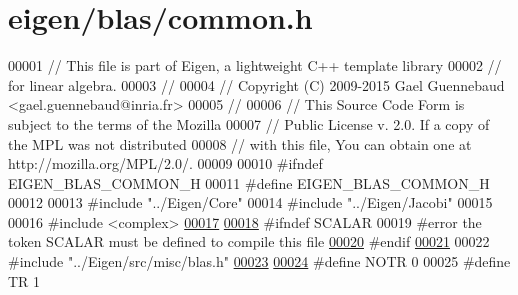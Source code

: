 \hypertarget{eigen_2blas_2common_8h_source}{}\section{eigen/blas/common.h}
\label{eigen_2blas_2common_8h_source}

\begin{DoxyCode}
00001 \textcolor{comment}{// This file is part of Eigen, a lightweight C++ template library}
00002 \textcolor{comment}{// for linear algebra.}
00003 \textcolor{comment}{//}
00004 \textcolor{comment}{// Copyright (C) 2009-2015 Gael Guennebaud <gael.guennebaud@inria.fr>}
00005 \textcolor{comment}{//}
00006 \textcolor{comment}{// This Source Code Form is subject to the terms of the Mozilla}
00007 \textcolor{comment}{// Public License v. 2.0. If a copy of the MPL was not distributed}
00008 \textcolor{comment}{// with this file, You can obtain one at http://mozilla.org/MPL/2.0/.}
00009 
00010 \textcolor{preprocessor}{#ifndef EIGEN\_BLAS\_COMMON\_H}
00011 \textcolor{preprocessor}{#define EIGEN\_BLAS\_COMMON\_H}
00012 
00013 \textcolor{preprocessor}{#include "../Eigen/Core"}
00014 \textcolor{preprocessor}{#include "../Eigen/Jacobi"}
00015 
00016 \textcolor{preprocessor}{#include <complex>}
\hyperlink{struct_eigen_1_1internal_1_1packed__triangular__solve__vector}{00017} 
\hyperlink{struct_eigen_1_1internal_1_1general__rank1__update}{00018} \textcolor{preprocessor}{#ifndef SCALAR}
00019 \textcolor{preprocessor}{#error the token SCALAR must be defined to compile this file}
\hyperlink{struct_eigen_1_1internal_1_1selfadjoint__packed__rank1__update}{00020} \textcolor{preprocessor}{#endif}
\hyperlink{struct_eigen_1_1internal_1_1packed__triangular__solve__vector_3_01_lhs_scalar_00_01_rhs_scalar_0cc30126adce0eb996f2d749aee4cc739}{00021} 
00022 \textcolor{preprocessor}{#include "../Eigen/src/misc/blas.h"}
\hyperlink{struct_eigen_1_1internal_1_1selfadjoint__packed__rank1__update_3_01_scalar_00_01_index_00_01_col211b56a6e7dbb087a746c109f1fd6193}{00023} 
\hyperlink{struct_eigen_1_1internal_1_1band__solve__triangular__selector_3_01_index_00_01_mode_00_01_lhs_scb3f84b84f0cb728030fb1bbaaacae5f9}{00024} \textcolor{preprocessor}{#define NOTR    0}
00025 \textcolor{preprocessor}{#define TR      1}

\end{DoxyCode}
